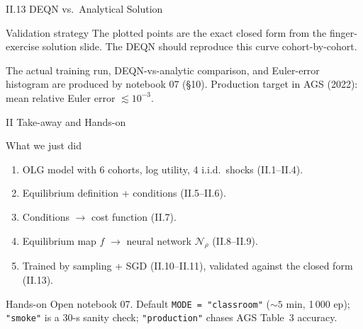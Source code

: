 \documentclass[aspectratio=169,11pt]{beamer}
\newcommand{\emphc}[1]{\textcolor{harvardcrimson}{#1}}
\newcommand{\N}{\mathcal{N}}
\begin{document}
\begin{frame}{II.13 DEQN vs.\ Analytical Solution}
\footnotesize
\centering
{}

\vspace{0.2em}
\begin{block}{Validation strategy}
\vspace{-2pt}
The plotted points are the \emphc{exact closed form} from the finger-exercise solution slide.  The DEQN should reproduce this curve cohort-by-cohort.

\vspace{2pt}
The actual training run, DEQN-vs-analytic comparison, and Euler-error histogram are produced by notebook 07 (\S 10).  Production target in AGS (2022): mean relative Euler error $\lesssim 10^{-3}$.
\end{block}
\end{frame}


\begin{frame}{II Take-away and Hands-on}
\footnotesize
\begin{block}{What we just did}
\begin{enumerate}\itemsep1pt
    \item OLG model with 6 cohorts, log utility, 4 i.i.d.\ shocks (II.1--II.4).
    \item Equilibrium definition + conditions (II.5--II.6).
    \item Conditions $\to$ \emphc{cost function} (II.7).
    \item Equilibrium map $f$ $\to$ neural network $\N_\rho$ (II.8--II.9).
    \item Trained by sampling + SGD (II.10--II.11), \emphc{validated} against the closed form (II.13).
\end{enumerate}
\end{block}

\begin{block}{Hands-on}
Open notebook 07.  Default \texttt{MODE = "classroom"} ($\sim 5$ min, 1\,000 ep); \texttt{"smoke"} is a 30-s sanity check; \texttt{"production"} chases AGS Table~3 accuracy.
\end{block}
\end{frame}
\end{document}
